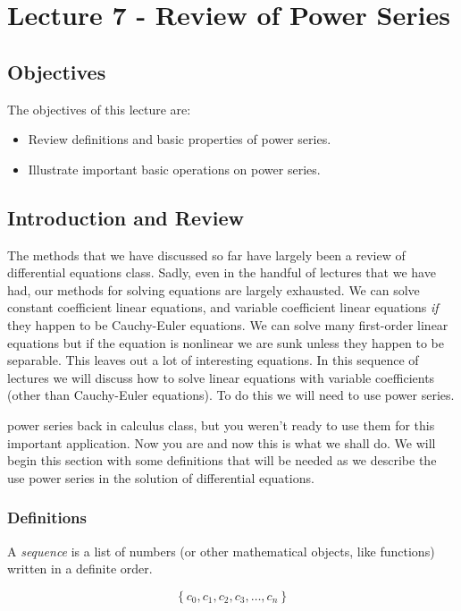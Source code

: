 \chapter{Lecture 7 - Review of Power Series}
\label{ch:lec7}
\section{Objectives}
The objectives of this lecture are:
\begin{itemize}
\item Review definitions and basic properties of power series.
\item Illustrate important basic operations on power series.
\end{itemize}

\section{Introduction and Review}
The methods that we have discussed so far have largely been a review of differential equations class.  Sadly, even in the handful of lectures that we have had, our methods for solving equations are largely exhausted.  We can solve constant coefficient linear equations, and variable coefficient linear equations \emph{if} they happen to be Cauchy-Euler equations.  We can solve many first-order linear equations but if the equation is nonlinear we are sunk unless they happen to be separable.  This leaves out a lot of interesting equations.  In this sequence of lectures we will discuss how to solve linear equations with variable coefficients (other than Cauchy-Euler equations).  To do this we will need to use power series. 

 power series back in calculus class, but you weren't ready to use them for this important application.  Now you are and now this is what we shall do.  We will begin this section with some definitions that will be needed as we describe the use power series in the solution of differential equations.

\subsection{Definitions}
\begin{definition}[Sequence]
A \emph{sequence} is a list of numbers (or other mathematical objects, like functions) written in a definite order.

\begin{equation*}
\left\{c_0, c_1, c_2, c_3, \dots , c_n\right\}
\end{equation*}
\end{definition}

